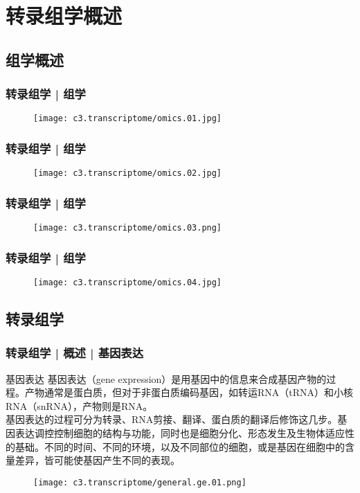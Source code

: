 \section{转录组学概述}
\subsection{组学概述}
\begin{frame}
  \frametitle{转录组学 | 组学}
  \begin{figure}
    \centering
    \texttt{[image: c3.transcriptome/omics.01.jpg]}
  \end{figure}
\end{frame}

\begin{frame}
  \frametitle{转录组学 | 组学}
  \begin{figure}
    \centering
    \texttt{[image: c3.transcriptome/omics.02.jpg]}
  \end{figure}
\end{frame}

\begin{frame}
  \frametitle{转录组学 | 组学}
  \begin{figure}
    \centering
    \texttt{[image: c3.transcriptome/omics.03.png]}
  \end{figure}
\end{frame}

\begin{frame}
  \frametitle{转录组学 | 组学}
  \begin{figure}
    \centering
    \texttt{[image: c3.transcriptome/omics.04.jpg]}
  \end{figure}
\end{frame}

\subsection{转录组学}
\begin{frame}
  \frametitle{转录组学 | 概述 | 基因表达}
  \begin{block}{基因表达}
 基因表达（gene expression）是用基因中的信息来合成基因产物的过程。产物通常是蛋白质，但对于非蛋白质编码基因，如转运RNA（tRNA）和小核RNA（snRNA），产物则是RNA。\\
 \vspace{0.5em}
基因表达的过程可分为转录、RNA剪接、翻译、蛋白质的翻译后修饰这几步。基因表达调控控制细胞的结构与功能，同时也是细胞分化、形态发生及生物体适应性的基础。不同的时间、不同的环境，以及不同部位的细胞，或是基因在细胞中的含量差异，皆可能使基因产生不同的表现。
  \end{block}
  \begin{figure}
    \centering
    \texttt{[image: c3.transcriptome/general.ge.01.png]}
  \end{figure}
\end{frame}

